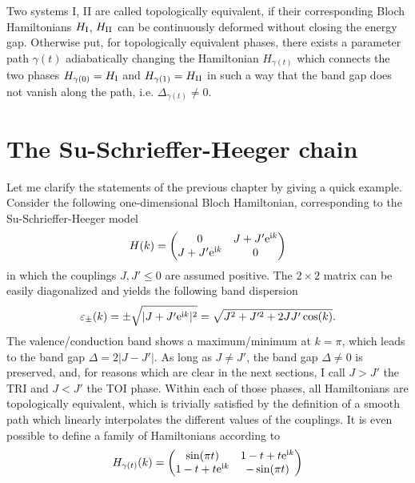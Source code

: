 Two systems I, II are called topologically equivalent, if their corresponding Bloch Hamiltonians $H_{\rm I}$, $H_{\rm II}$ can be continuously deformed without closing the energy gap.
Otherwise put, for topologically equivalent phases, there exists a parameter path $\gamma(t)$ adiabatically changing the Hamiltonian $H_{\gamma(t)}$ which connects the two phases $H_{\gamma(0)}=H_{\rm I}$ and $H_{\gamma(1)}=H_{\rm II}$ in such a way that the band gap does not vanish along the path, i.e. $\Delta_{\gamma(t)}\neq0$.
%
%
\section{The Su-Schrieffer-Heeger chain}
\label{sec:the_SSH_chain}
%
%
Let me clarify the statements of the previous chapter by giving a quick example.
Consider the following one-dimensional Bloch Hamiltonian, corresponding to the Su-Schrieffer-Heeger model
\begin{align}
    H(k)
    =
    \begin{pmatrix}
        0 & J+J'\mathrm e^{\mathrm i k}\\
        J+J'\mathrm e^{\mathrm i k} & 0
    \end{pmatrix}
\end{align}
in which the couplings $J,J'\leq0$ are assumed positive.
The $2\times2$ matrix can be easily diagonalized and yields the following band dispersion
\begin{align}
    \varepsilon_{\pm}(k) = \pm \sqrt{|J+J'\mathrm e^{\mathrm i k}|^2} = \sqrt{J^2+J'^2+2JJ'\cos(k)}.
\end{align}
The valence/conduction band shows a maximum/minimum at $k=\pi$, which leads to the band gap $\Delta = 2\left|J-J'\right|$.
As long as $J\neq J'$, the band gap $\Delta\neq0$ is preserved, and, for reasons which are clear in the next sections, I call $J>J'$ the TRI and $J<J'$ the TOI phase.
Within each of those phases, all Hamiltonians are topologically equivalent, which is trivially satisfied by the definition of a smooth path which linearly interpolates the different values of the couplings.
It is even possible to define a family of Hamiltonians according to
\begin{align}
    H_{\gamma(t)}(k) =
    \begin{pmatrix}
        \sin(\pi t) & 1-t + t\mathrm e^{\mathrm i k} \\
        1-t + t\mathrm e^{\mathrm i k} & -\sin(\pi t)
    \end{pmatrix}
    \label{eq:hamiltonian_path}
\end{align}
